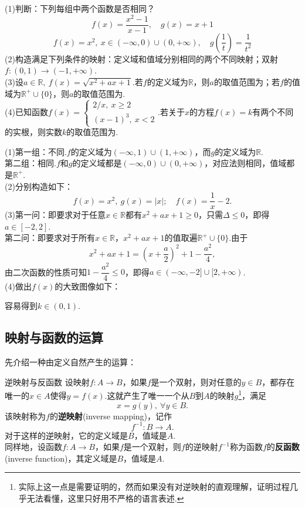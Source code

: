 \documentclass[lang=cn, zihao=5]{elegantbook}
\newcommand{\ssb}[1]{\left( #1 \right)}
\newcommand{\R}{\mathbb{R}}
\newcommand{\tk}{\uline{\hspace{4em}}}
\begin{document}
\begin{example}
	(1)判断：下列每组中两个函数是否相同？
	$$f(x)=\frac{x^2-1}{x-1},\quad g(x)=x+1$$
	$$f(x)=x^2,~x \in (-\infty ,0)\cup (0,+\infty),\quad g\ssb{\frac{1}{t}}=\frac{1}{t^2}$$
	(2)构造满足下列条件的映射：定义域和值域分别相同的两个不同映射；双射$f:(0,1) \to (-1,+\infty)$. \\
	(3)设$a \in \R ,~f(x)=\sqrt{x^2+ax+1}$.若$f$的定义域为$\R$，则$a$的取值范围为\tk ；若$f$的值域为$\R ^{+} \cup \{ 0 \}$，则$a$的取值范围为\tk . \\
	(4)已知函数$f(x)=\begin{cases}
		2/x,~x \geq 2 \\ (x-1)^3,~x<2
	\end{cases}$.若关于$x$的方程$f(x)=k$有两个不同的实根，则实数$k$的取值范围为\tk .
\end{example}
\begin{solution}
	(1)第一组：不同.$f$的定义域为$(-\infty ,1)\cup (1,+\infty)$，而$g$的定义域为$\R$. \\
	第二组：相同.$f$和$g$的定义域都是$(-\infty ,0)\cup (0,+\infty)$，对应法则相同，值域都是$\R ^{+}$. \\
	(2)分别构造如下：$$f(x)=x^2, ~g(x)=|x|;\quad f(x)=\frac{1}{x}-2.$$
	(3)第一问：即要求对于任意$x \in \R$都有$x^2+ax+1 \geq 0$，只需$\Delta \leq 0$，即得$a \in [-2,2]$. \\
	第二问：即要求对于所有$x \in \R$，$x^2+ax+1$的值取遍$\R ^{+} \cup \{ 0 \}$.由于$$x^2+ax+1 = \ssb{x+\frac{a}{2}}^2 + 1-\frac{a^2}{4},$$
	由二次函数的性质可知$1-\dfrac{a^2}{4} \leq 0$，即得$a \in (-\infty ,-2]\cup [2,+\infty)$. \\
	(4)做出$f(x)$的大致图像如下：
	\begin{figure}[h!]
		\centering
		
	\end{figure}
	容易得到$k \in (0,1)$.
\end{solution}

\vspace{2em}
\subsection{映射与函数的运算}

先介绍一种由定义自然产生的运算：

\begin{definition}{逆映射与反函数} %
    设映射$f:A \to B$，如果$f$是一个双射，则对任意的$y \in B$，都存在唯一的$x \in A$使得$y=f(x)$.这就产生了唯一一个从$B$到$A$的映射$g$\footnote{实际上这一点是需要证明的，然而如果没有对逆映射的直观理解，证明过程几乎无法看懂，这里只好用不严格的语言表述.}，满足$$x=g(y),~\forall y \in B.$$
    该映射称为$f$的\textbf{逆映射}(inverse mapping)，记作$$f^{-1}:B \to A.$$
    对于这样的逆映射，它的定义域是$B$，值域是$A$.\\
    同样地，设函数$f:A \to B$，如果$f$是一个双射，则$f$的逆映射$f^{-1}$称为函数$f$的\textbf{反函数}(inverse function)，其定义域是$B$，值域是$A$.
\end{definition}
\end{document}
